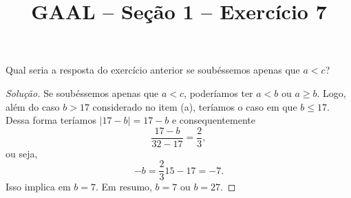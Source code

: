 \documentclass[a4paper,11pt]{article}
\title{GAAL -- Seção 1 -- Exercício 7}
\author{\empty}
\date{\empty}
\newcommand\onlyinsubfileone\maketitle
\begin{document}
\onlyinsubfileone

\begin{exercicio-gaal}[E7.S1]
  Qual seria a resposta do exercício anterior se soubéssemos apenas que $a < c$?
\end{exercicio-gaal}

\begin{proof}[Solução]
  Se soubéssemos apenas que $a < c$, poderíamos ter $a < b$ ou $a \ge b$.
  Logo, além do caso $b > 17$ considerado no item (a), teríamos o caso em que $b \le 17$.
  Dessa forma teríamos $|17-b| = 17-b$ e consequentemente
  \[
    \frac{17-b}{32-17} = \frac{2}{3},
  \]
  ou seja,
  \[
    -b = \frac{2}{3} 15 - 17 = -7.
  \]
  Isso implica em $b = 7$.
  Em resumo, $b = 7$ ou $b = 27$.
\end{proof}
\end{document}

